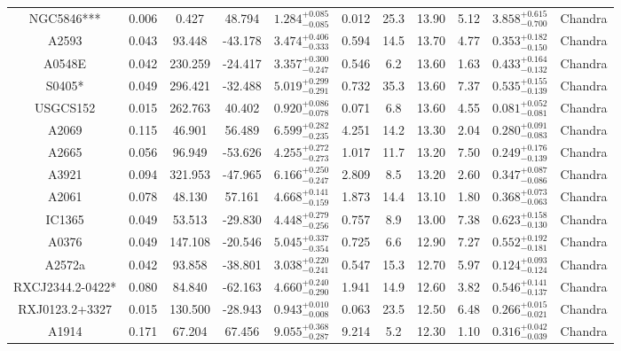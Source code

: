 \documentclass{aa}   %
\begin{document}
\begin{table}[h!]
\begin{center}
\begin{tabular}{ c  c  c  c c c c c c c c }
NGC5846***          		&		0.006	&	0.427	&	48.794	& $	1.284^{+0.085}_{-0.085}$  &      0.012	&  25.3	&	13.90	&	5.12	&	$ 3.858^{+0.615}_{-0.700}  $ &	  Chandra     \\
A2593               		&		0.043	&	93.448	&	-43.178	& $	3.474^{+0.406}_{-0.333}$  &      0.594	&  14.5	&	13.70	&	4.77	&	$ 0.353^{+0.182}_{-0.150}  $ &	  Chandra     \\
A0548E              		&		0.042	&	230.259	&	-24.417	& $	3.357^{+0.300}_{-0.247}$  &      0.546	&  6.2	&	13.60	&	1.63	&	$ 0.433^{+0.164}_{-0.132}  $ &	  Chandra     \\
S0405*              		&		0.049	&	296.421	&	-32.488	& $	5.019^{+0.299}_{-0.291}$  &      0.732	&  35.3	&	13.60	&	7.37	&	$ 0.535^{+0.155}_{-0.139}  $ &	 Chandra      \\
USGCS152            		&		0.015	&	262.763	&	40.402	& $	0.920^{+0.086}_{-0.078}$  &      0.071	&  6.8	&	13.60	&	4.55	&	$ 0.081^{+0.052}_{-0.081}  $ &	 Chandra      \\
A2069               		&		0.115	&	46.901	&	56.489	& $	6.599^{+0.282}_{-0.235}$  &      4.251	&  14.2	&	13.30	&	2.04	&	$ 0.280^{+0.091}_{-0.083}  $ &	  Chandra     \\
A2665               		&		0.056	&	96.949	&	-53.626	& $	4.255^{+0.272}_{-0.273}$  &      1.017	&  11.7	&	13.20	&	7.50	&	$ 0.249^{+0.176}_{-0.139}  $ &	 Chandra      \\
A3921               		&		0.094	&	321.953	&	-47.965	& $	6.166^{+0.250}_{-0.247}$  &      2.809	&  8.5	&	13.20	&	2.60	&	$ 0.347^{+0.087}_{-0.086}  $ &	  Chandra     \\
A2061               		&		0.078	&	48.130	&	57.161	& $	4.668^{+0.141}_{-0.159}$  &      1.873	&  14.4	&	13.10	&	1.80	&	$ 0.368^{+0.073}_{-0.063}  $ &	  Chandra     \\
IC1365              		&		0.049	&	53.513	&	-29.830	& $	4.448^{+0.279}_{-0.256}$  &      0.757	&  8.9	&	13.00	&	7.38	&	$ 0.623^{+0.158}_{-0.130}  $ &	 Chandra      \\
A0376               		&		0.049	&	147.108	&	-20.546	& $	5.045^{+0.337}_{-0.354}$  &      0.725	&  6.6	&	12.90	&	7.27	&	$ 0.552^{+0.192}_{-0.181}  $ &	 Chandra      \\
A2572a              		&		0.042	&	93.858	&	-38.801	& $	3.038^{+0.220}_{-0.241}$  &      0.547	&  15.3	&	12.70	&	5.97	&	$ 0.124^{+0.093}_{-0.124}  $ &	 Chandra      \\
RXCJ2344.2-0422*    		&		0.080	&	84.840	&	-62.163	& $	4.660^{+0.240}_{-0.290}$  &      1.941	&  14.9	&	12.60	&	3.82	&	$ 0.546^{+0.141}_{-0.137}  $ &	  Chandra     \\
RXJ0123.2+3327      		&		0.015	&   130.500	&	-28.943	& $	0.943^{+0.010}_{-0.008}$  &      0.063	&  23.5	&	12.50	&	6.48	&	$ 0.266^{+0.015}_{-0.021}  $ &	 Chandra      \\
A1914               		&		0.171	&	67.204	&	67.456	& $	9.055^{+0.368}_{-0.287}$  &      9.214	&  5.2	&	12.30	&	1.10	&	$ 0.316^{+0.042}_{-0.039}  $ &	  Chandra     \\



\end{tabular}
\end{center}
\end{table}
\end{document}
